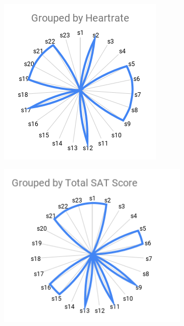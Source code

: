 \begin{figure}[ht!]
    \begin{subfigure}{\columnwidth}
    \centering
    \includegraphics[width=.86\columnwidth]{figs/images/GroupedbyHeartrate.png}
    \caption{}
    \label{fig:g1}
    \end{subfigure}%
    \begin{subfigure}{\columnwidth}
    \centering
    \includegraphics[width=\columnwidth]{figs/images/GroupedbyTotalSAT.png}
    \caption{}
    \label{fig:g2}
    \end{subfigure}
    

\end{figure}
